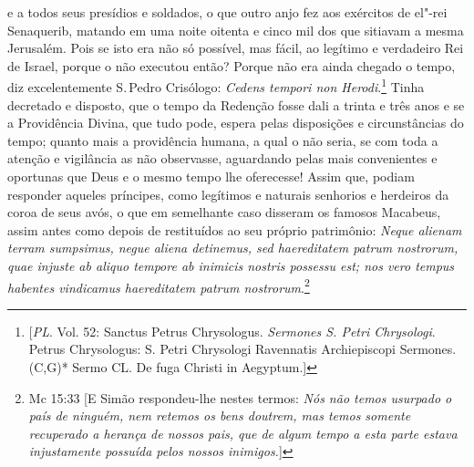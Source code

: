 e a todos seus presídios e soldados, o que outro anjo fez aos exércitos
de el"-rei Senaquerib, matando em uma noite oitenta e cinco mil dos que
sitiavam a mesma Jerusalém. Pois se isto era não só possível, mas fácil,
ao legítimo e verdadeiro Rei de Israel, porque o não executou então?
Porque não era ainda chegado o tempo, diz excelentemente S.\,Pedro
Crisólogo: \emph{Cedens tempori non Herodi}.\footnote{[\textit{PL}. Vol. 52: Sanctus Petrus Chrysologus. \textit{Sermones S. Petri Chrysologi}. Petrus Chrysologus: S. Petri Chrysologi Ravennatis Archiepiscopi Sermones. (C,G)* Sermo CL. De fuga Christi in Aegyptum.]} Tinha decretado e disposto,
que o tempo da Redenção fosse dali a trinta e três anos e se a
Providência Divina, que tudo pode, espera pelas disposições e
circunstâncias do tempo; quanto mais a providência humana, a qual o não
seria, se com toda a atenção e vigilância as não observasse, aguardando
pelas mais convenientes e oportunas que Deus e o mesmo tempo lhe
oferecesse! Assim que, podiam responder aqueles príncipes, como
legítimos e naturais senhorios e herdeiros da coroa de seus avós, o que
em semelhante caso disseram os famosos Macabeus, assim antes como depois
de restituídos ao seu próprio patrimônio: \emph{Neque alienam terram
sumpsimus, negue aliena detinemus, sed haereditatem patrum nostrorum,
quae injuste ab aliquo tempore ab inimicis nostris possessu est; nos
vero tempus habentes vindicamus haereditatem patrum nostrorum}.\footnote{Mc 15:33 [E Simão respondeu-lhe nestes termos: \textit{Nós não temos usurpado o país de ninguém, nem retemos os bens doutrem, mas temos somente recuperado a herança de nossos pais, que de algum tempo a esta parte estava injustamente possuída pelos nossos inimigos.}]}


